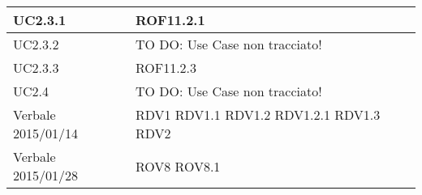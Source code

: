 \begin{center}
\begin{longtable}{| p{4cm} | p{4cm} |}
\hline
UC2.3.1 & ROF11.2.1 \\
\hline
UC2.3.2 & TO DO: Use Case non tracciato! \\
\hline
UC2.3.3 & ROF11.2.3 \\
\hline
UC2.4 & TO DO: Use Case non tracciato! \\
\hline
Verbale 2015/01/14 & RDV1 \newline RDV1.1 \newline RDV1.2 \newline RDV1.2.1 \newline RDV1.3 \newline RDV2 \\
\hline
Verbale 2015/01/28 & ROV8 \newline ROV8.1 \\
\hline
\end{longtable}
\egroup
\end{center}
